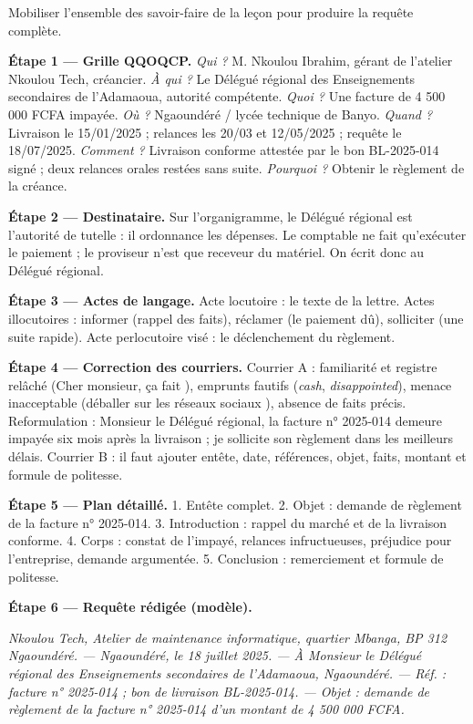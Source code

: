 \documentclass[11pt]{article}
\begin{document}
\begin{exoresolu}
Mobiliser l'ensemble des savoir-faire de la leçon pour produire la requête complète.

\tcblower

\textbf{Étape 1 — Grille QQOQCP.} \emph{Qui ?} M. Nkoulou Ibrahim, gérant de l'atelier Nkoulou Tech, créancier. \emph{À qui ?} Le Délégué régional des Enseignements secondaires de l'Adamaoua, autorité compétente. \emph{Quoi ?} Une facture de 4 500 000 FCFA impayée. \emph{Où ?} Ngaoundéré / lycée technique de Banyo. \emph{Quand ?} Livraison le 15/01/2025 ; relances les 20/03 et 12/05/2025 ; requête le 18/07/2025. \emph{Comment ?} Livraison conforme attestée par le bon BL-2025-014 signé ; deux relances orales restées sans suite. \emph{Pourquoi ?} Obtenir le règlement de la créance.

\textbf{Étape 2 — Destinataire.} Sur l'organigramme, le Délégué régional est l'autorité de tutelle : il ordonnance les dépenses. Le comptable ne fait qu'exécuter le paiement ; le proviseur n'est que receveur du matériel. On écrit donc au Délégué régional.

\textbf{Étape 3 — Actes de langage.} Acte locutoire : le texte de la lettre. Actes illocutoires : informer (rappel des faits), réclamer (le paiement dû), solliciter (une suite rapide). Acte perlocutoire visé : le déclenchement du règlement.

\textbf{Étape 4 — Correction des courriers.} Courrier A : familiarité et registre relâché (\og Cher monsieur, ça fait \fg{}), emprunts fautifs (\emph{cash}, \emph{disappointed}), menace inacceptable (\og déballer sur les réseaux sociaux \fg{}), absence de faits précis. Reformulation : \og Monsieur le Délégué régional, la facture n° 2025-014 demeure impayée six mois après la livraison ; je sollicite son règlement dans les meilleurs délais. \fg{} Courrier B : il faut ajouter entête, date, références, objet, faits, montant et formule de politesse.

\textbf{Étape 5 — Plan détaillé.} 1. Entête complet. 2. Objet : demande de règlement de la facture n° 2025-014. 3. Introduction : rappel du marché et de la livraison conforme. 4. Corps : constat de l'impayé, relances infructueuses, préjudice pour l'entreprise, demande argumentée. 5. Conclusion : remerciement et formule de politesse.

\textbf{Étape 6 — Requête rédigée (modèle).}

\emph{Nkoulou Tech, Atelier de maintenance informatique, quartier Mbanga, BP 312 Ngaoundéré. — Ngaoundéré, le 18 juillet 2025. — À Monsieur le Délégué régional des Enseignements secondaires de l'Adamaoua, Ngaoundéré. — Réf. : facture n° 2025-014 ; bon de livraison BL-2025-014. — Objet : demande de règlement de la facture n° 2025-014 d'un montant de 4 500 000 FCFA.}


\end{exoresolu}
\end{document}
